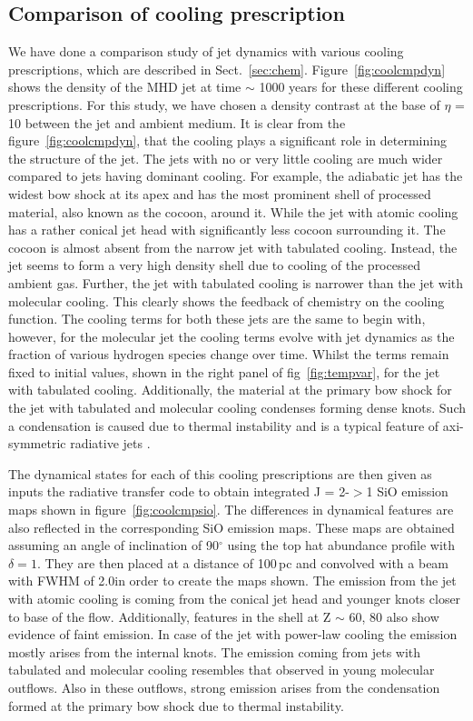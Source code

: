 \documentclass[useAMS,usenatbib]{mn2e}
\begin{document}
\subsection{Comparison of cooling prescription}
\label{ssec:coolres}
We have done a comparison study of jet dynamics with various cooling
prescriptions, which are described in
Sect.~\ref{sec:chem}. Figure~\ref{fig:coolcmpdyn} shows the density of the MHD
jet at time $\sim$ 1000 years for these different cooling
prescriptions. For this study, we have chosen a density contrast at the base of
$\eta$ = 10 between the jet and ambient medium.
It is clear from the figure~\ref{fig:coolcmpdyn}, that the cooling plays a
significant role in determining the structure of the jet. The jets
with no or very little cooling are much wider compared to
jets having dominant cooling. For example, the adiabatic jet
has the widest bow shock at its apex and has the most prominent shell
of processed material, also known as the cocoon,
around it. While the jet with atomic cooling has a rather conical
jet head with significantly less cocoon surrounding it. The cocoon is
almost absent from the narrow jet with tabulated cooling. Instead, the jet
seems to form a very high density shell due to cooling of the
processed ambient gas. Further, the jet with tabulated cooling is narrower than the jet with molecular cooling. This clearly
shows the feedback of chemistry on the cooling function. The cooling
terms for both these jets are the same to begin with, however,
for the molecular jet the cooling terms evolve with jet dynamics as the fraction of
various hydrogen species change over time. Whilst the terms remain fixed to initial values, shown in the right panel of fig~\ref{fig:tempvar}, for the jet with tabulated
cooling. Additionally, the material at the primary bow shock for the jet
with tabulated and molecular cooling condenses forming dense knots. 
Such a condensation is caused due to thermal instability and is 
a typical feature of axi-symmetric radiative jets 
\citep[see, for e.g,][]{Blondin:1990p2130,Cerqueira:1999p15052}.
%

The dynamical states for each of this cooling prescriptions are then 
given as inputs the radiative transfer code to obtain integrated J = 2-$>$1 SiO emission
maps shown in figure~\ref{fig:coolcmpsio}. The differences in dynamical
features are also reflected in the corresponding SiO emission
maps. These maps are obtained assuming an angle of inclination of
90$^\circ$ using the top hat abundance
profile with $\delta = 1$. They are then placed at a distance of
100$\,$pc and convolved with a beam with FWHM of 2.0\arcsec in order
to create the maps shown. 
The emission from the jet with atomic
cooling is coming from the conical jet head and younger knots closer
to base of the flow. Additionally, features in the shell at Z $\sim$
60, 80 also show evidence of faint emission. In case of the jet with
power-law cooling the emission mostly arises from the
internal knots. 
The emission coming from jets with
tabulated and molecular cooling resembles that observed in young molecular outflows.
Also in these outflows, strong emission arises from the
condensation formed at the primary bow shock due to thermal
instability. 
%
\end{document}
